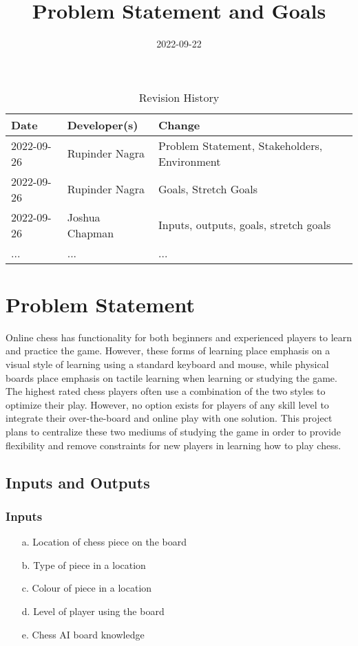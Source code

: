 \documentclass{article}
\title{Problem Statement and Goals\\\progname}
\author{\authname}
\date{2022-09-22}
\begin{document}
\maketitle

\begin{table}[hp]
\caption{Revision History} \label{TblRevisionHistory}
\begin{tabularx}{\textwidth}{llX}
\toprule
\textbf{Date} & \textbf{Developer(s)} & \textbf{Change}\\
\midrule
2022-09-26 & Rupinder Nagra & Problem Statement, Stakeholders, Environment\\
2022-09-26 & Rupinder Nagra & Goals, Stretch Goals\\
2022-09-26 & Joshua Chapman & Inputs, outputs, goals, stretch goals\\
... & ... & ...\\
\bottomrule
\end{tabularx}
\end{table}

\section{Problem Statement}

{Online chess has functionality for both beginners and experienced players to learn and practice the game. However, these forms of learning place emphasis on a visual style of learning using a standard keyboard and mouse, while physical boards place emphasis on tactile learning when learning or studying the game. The highest rated chess players often use a combination of the two styles to optimize their play. However, no option exists for players of any skill level to integrate their over-the-board and online play with one solution. This project plans to centralize these two mediums of studying the game in order to provide flexibility and remove constraints for new players in learning how to play chess.}

\subsection{Inputs and Outputs}

\subsubsection{Inputs}
\begin{enumerate}
    \item[a.] Location of chess piece on the board
    \item[b.] Type of piece in a location
    \item[c.] Colour of piece in a location
    \item[d.] Level of player using the board
    \item[e.] Chess AI board knowledge
\end{enumerate}
\end{document}
